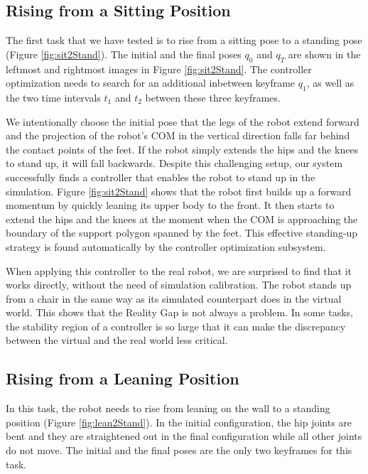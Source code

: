 \subsection{Rising from a Sitting Position}

The first task that we have tested is to rise from a sitting pose to a standing pose (Figure \ref{fig:sit2Stand}). The initial and the final poses $q_0$ and $q_T$ are shown in the leftmost and rightmost images in Figure \ref{fig:sit2Stand}. The controller optimization needs to search for an additional inbetween keyframe $q_1$, as well as the two time intervals $t_1$ and $t_2$ between these three keyframes. 

We intentionally choose the initial pose that the legs of the robot extend forward and the projection of the robot's COM in the vertical direction falls far behind the contact points of the feet. If the robot simply extends the hips and the knees to stand up, it will fall backwards. Despite this challenging setup, our system successfully finds a controller that enables the robot to stand up in the simulation. Figure \ref{fig:sit2Stand} shows that the robot first builds up a forward momentum by quickly leaning its upper body to the front. It then starts to extend the hips and the knees at the moment when the COM is approaching the boundary of the support polygon spanned by the feet. This effective standing-up strategy is found automatically by the controller optimization subsystem.

When applying this controller to the real robot, we are surprised to find that it works directly, without the need of simulation calibration. The robot stands up from a chair in the same way as its simulated counterpart does in the virtual world. This shows that the Reality Gap is not always a problem. In some tasks, the stability region of a controller is so large that it can make the discrepancy between the virtual and the real world less critical.

\subsection{Rising from a Leaning Position}

In this task, the robot needs to rise from leaning on the wall to a standing position (Figure \ref{fig:lean2Stand}). In the initial configuration, the hip joints are bent and they are straightened out in the final configuration while all other joints do not move. The initial and the final poses are the only two keyframes for this task.

